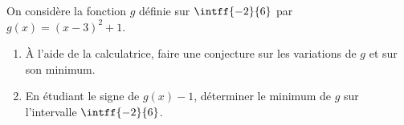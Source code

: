 \exo

On considère la fonction $g$ définie sur $\intff{-2}{6}$ par $g(x)=(x-3)^2+1$.
\begin{enumerate}
\item À l'aide de la calculatrice, faire une conjecture sur les variations de $g$ et sur son minimum.
\item En étudiant le signe de $g(x)-1$, déterminer le minimum de $g$ sur l'intervalle $\intff{-2}{6}$.
\end{enumerate}

